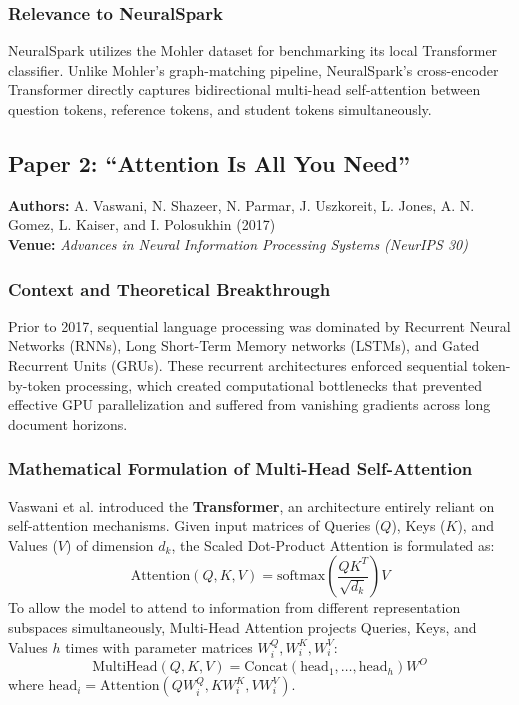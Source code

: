 \subsubsection{Relevance to NeuralSpark}
NeuralSpark utilizes the Mohler dataset for benchmarking its local Transformer classifier. Unlike Mohler's graph-matching pipeline, NeuralSpark's cross-encoder Transformer directly captures bidirectional multi-head self-attention between question tokens, reference tokens, and student tokens simultaneously.

\subsection{Paper 2: ``Attention Is All You Need''}
\textbf{Authors:} A. Vaswani, N. Shazeer, N. Parmar, J. Uszkoreit, L. Jones, A. N. Gomez, L. Kaiser, and I. Polosukhin (2017) \cite{vaswani2017} \\
\textbf{Venue:} \textit{Advances in Neural Information Processing Systems (NeurIPS 30)}

\subsubsection{Context and Theoretical Breakthrough}
Prior to 2017, sequential language processing was dominated by Recurrent Neural Networks (RNNs), Long Short-Term Memory networks (LSTMs), and Gated Recurrent Units (GRUs). These recurrent architectures enforced sequential token-by-token processing, which created computational bottlenecks that prevented effective GPU parallelization and suffered from vanishing gradients across long document horizons.

\subsubsection{Mathematical Formulation of Multi-Head Self-Attention}
Vaswani et al. introduced the \textbf{Transformer}, an architecture entirely reliant on self-attention mechanisms. Given input matrices of Queries ($Q$), Keys ($K$), and Values ($V$) of dimension $d_k$, the Scaled Dot-Product Attention is formulated as:
\begin{equation}
    \text{Attention}(Q, K, V) = \text{softmax}\left( \frac{QK^T}{\sqrt{d_k}} \right) V
\end{equation}
To allow the model to attend to information from different representation subspaces simultaneously, Multi-Head Attention projects Queries, Keys, and Values $h$ times with parameter matrices $W_i^Q, W_i^K, W_i^V$:
\begin{equation}
    \text{MultiHead}(Q, K, V) = \text{Concat}(\text{head}_1, \dots, \text{head}_h) W^O
\end{equation}
where $\text{head}_i = \text{Attention}(Q W_i^Q, K W_i^K, V W_i^V)$.

